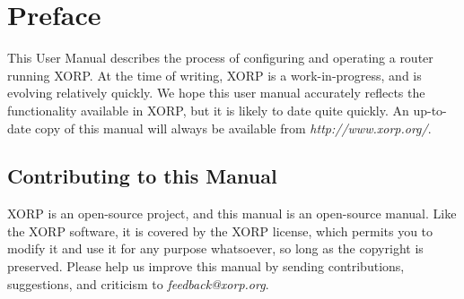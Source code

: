 %
%

\chapter*{Preface}

\vspace{-0.1in}
This User Manual describes the process of configuring and operating a
router running XORP.  At the time of writing, XORP is a
work-in-progress, and is evolving relatively quickly.  We hope this
user manual accurately reflects the functionality available in XORP,
but it is likely to date quite quickly.  An up-to-date copy of this
manual will always be available from {\it http://www.xorp.org/}.

\section*{Contributing to this Manual}
\vspace{-0.1in}
XORP is an open-source project, and this manual is an open-source
manual.  Like the XORP software, it is covered by the XORP license,
which permits you to modify it and use it for any purpose whatsoever,
so long as the copyright is preserved.  Please help us improve this
manual by sending contributions, suggestions, and criticism to {\it
  feedback@xorp.org}.

